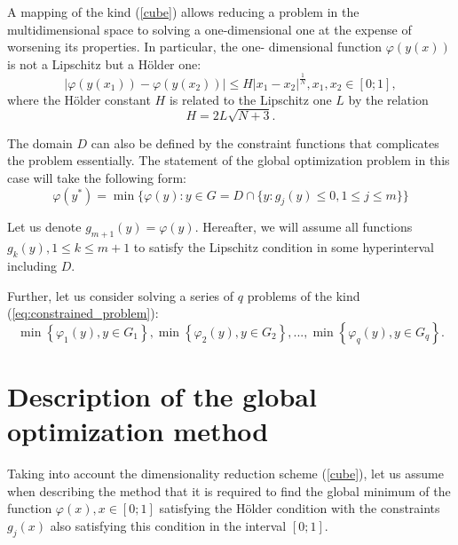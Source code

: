 \documentclass[runningheads]{llncs}
\begin{document}
A mapping of the kind (\ref{cube}) allows reducing a problem in the multidimensional space to
solving a one-dimensional one at the expense of worsening its properties. In particular, the one-
dimensional function \(\varphi(y(x))\) is not a Lipschitz but a H\"{o}lder one:
\begin{displaymath}
\label{holder}
|\varphi(y(x_1))-\varphi(y(x_2))|\leqslant H{|x_1-x_2|}^{\frac{1}{N}},x_1,x_2\in[0;1],
\end{displaymath}
where the H\"{o}lder constant \(H\) is related to the Lipschitz one \(L\) by the relation
\begin{displaymath}
  H=2L\sqrt{N+3}.
\end{displaymath}

The domain \(D\) can also be defined by the constraint functions that complicates the problem
essentially.
The statement of the global optimization problem in this case will take the following form:
\begin{equation}
  \label{eq:constrained_problem}
  \varphi(y^*)=\min\{\varphi(y):y\in G=D \cap \{y: g_j(y)\leqslant 0, 1\leqslant j\leqslant m\}\}
\end{equation}

Let us denote \(g_{m+1}(y)=\varphi(y)\). Hereafter, we will assume all functions
\(g_k(y),1\leqslant k \leqslant m+1\)
to satisfy the Lipschitz condition in some hyperinterval including \(D\).

Further, let us consider solving a series of \(q\) problems of the kind
(\ref{eq:constrained_problem}):
\begin{equation}
  \label{eq:many_problems}
  \min\left\{\varphi_1(y), y\in G_1 \right\}, \min\left\{\varphi_2(y), y\in G_2\right\},...,
\min\left\{\varphi_q(y), y\in G_q\right\}.
\end{equation}

\section{Description of the global optimization method}
\label{sec:method}

Taking into account the dimensionality reduction scheme (\ref{cube}), let us assume when
describing the method that it is required to find the global minimum of the function \(\varphi(x),
x\in[0;1]\) satisfying the H\"{o}lder condition with the constraints \(g_j(x)\) also satisfying this
condition in the interval \([0;1]\).
\end{document}
